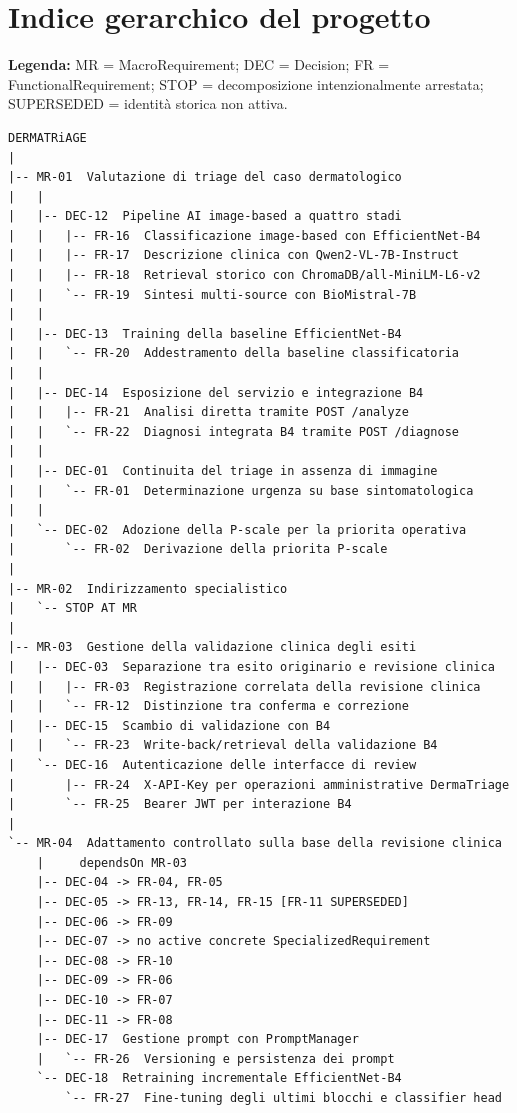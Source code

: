 \documentclass[11pt,a4paper]{article}
\begin{document}
\section*{Indice gerarchico del progetto}

\begin{hierarchybox}[title={DermaTriage - current governed hierarchy}]
{\small\textbf{Legenda:} MR = MacroRequirement; DEC = Decision; FR = FunctionalRequirement; STOP = decomposizione intenzionalmente arrestata; SUPERSEDED = identità storica non attiva.}
\begin{lstlisting}[basicstyle=\ttfamily\scriptsize]
DERMATRiAGE
|
|-- MR-01  Valutazione di triage del caso dermatologico
|   |
|   |-- DEC-12  Pipeline AI image-based a quattro stadi
|   |   |-- FR-16  Classificazione image-based con EfficientNet-B4
|   |   |-- FR-17  Descrizione clinica con Qwen2-VL-7B-Instruct
|   |   |-- FR-18  Retrieval storico con ChromaDB/all-MiniLM-L6-v2
|   |   `-- FR-19  Sintesi multi-source con BioMistral-7B
|   |
|   |-- DEC-13  Training della baseline EfficientNet-B4
|   |   `-- FR-20  Addestramento della baseline classificatoria
|   |
|   |-- DEC-14  Esposizione del servizio e integrazione B4
|   |   |-- FR-21  Analisi diretta tramite POST /analyze
|   |   `-- FR-22  Diagnosi integrata B4 tramite POST /diagnose
|   |
|   |-- DEC-01  Continuita del triage in assenza di immagine
|   |   `-- FR-01  Determinazione urgenza su base sintomatologica
|   |
|   `-- DEC-02  Adozione della P-scale per la priorita operativa
|       `-- FR-02  Derivazione della priorita P-scale
|
|-- MR-02  Indirizzamento specialistico
|   `-- STOP AT MR
|
|-- MR-03  Gestione della validazione clinica degli esiti
|   |-- DEC-03  Separazione tra esito originario e revisione clinica
|   |   |-- FR-03  Registrazione correlata della revisione clinica
|   |   `-- FR-12  Distinzione tra conferma e correzione
|   |-- DEC-15  Scambio di validazione con B4
|   |   `-- FR-23  Write-back/retrieval della validazione B4
|   `-- DEC-16  Autenticazione delle interfacce di review
|       |-- FR-24  X-API-Key per operazioni amministrative DermaTriage
|       `-- FR-25  Bearer JWT per interazione B4
|
`-- MR-04  Adattamento controllato sulla base della revisione clinica
    |     dependsOn MR-03
    |-- DEC-04 -> FR-04, FR-05
    |-- DEC-05 -> FR-13, FR-14, FR-15 [FR-11 SUPERSEDED]
    |-- DEC-06 -> FR-09
    |-- DEC-07 -> no active concrete SpecializedRequirement
    |-- DEC-08 -> FR-10
    |-- DEC-09 -> FR-06
    |-- DEC-10 -> FR-07
    |-- DEC-11 -> FR-08
    |-- DEC-17  Gestione prompt con PromptManager
    |   `-- FR-26  Versioning e persistenza dei prompt
    `-- DEC-18  Retraining incrementale EfficientNet-B4
        `-- FR-27  Fine-tuning degli ultimi blocchi e classifier head
\end{lstlisting}
\end{hierarchybox}
\end{document}
